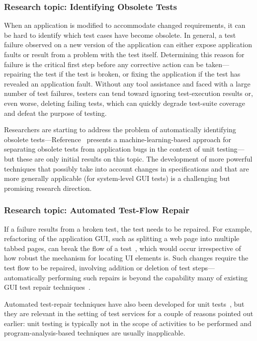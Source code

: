 \subsubsection*{Research topic: Identifying Obsolete Tests}

When an application is modified to accommodate changed requirements, it can be
hard to identify which test cases have become obsolete.  In general, a test
failure observed on a new version of the application can either expose
application faults or result from a problem with the test itself. Determining
this reason for failure is the critical first step before any corrective action
can be taken---repairing the test if the test is broken, or fixing the
application if the test has revealed an application fault. Without any tool
assistance and faced with a large number of test failures, testers can tend
toward ignoring test-execution results or, even worse, deleting failing tests,
which can quickly degrade test-suite coverage and defeat the purpose of testing.

Researchers are starting to address the problem of automatically identifying
obsolete tests---\eg Reference~\cite{Hao:2013} presents a machine-learning-based
approach for separating obsolete tests from application bugs in the context of
unit testing---but these are only initial results on this topic. The development
of more powerful techniques that possibly take into account changes in
specifications and that are more generally applicable (\eg for system-level GUI
tests) is a challenging but promising research direction.

\subsubsection*{Research topic: Automated Test-Flow Repair}

If a failure results from a broken test, the test needs to be repaired.  For
example, refactoring of the application GUI, such as splitting a web page into
multiple tabbed pages, can break the flow of a test~\cite{thummalapenta:2013a},
which would occur irrespective of how robust the mechanism for locating UI
elements is. Such changes require the test flow to be repaired, involving
addition or deletion of test steps---automatically performing such repairs is
beyond the capability many of existing GUI test repair
techniques~\cite{Choudhary:2011, Grechanik:2009, Memon:2008}.

Automated test-repair techniques have also been developed for unit
tests~\cite{Daniel:2009, Daniel:2010, Mirzaaghaei:2012}, but they are relevant
in the setting of test services for a couple of reasons pointed out earlier:
unit testing is typically not in the scope of activities to be performed and
program-analysis-based techniques are usually inapplicable.

